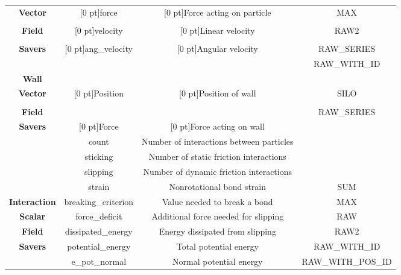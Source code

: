 \begin{table}[h]
\begin{center}
\begin{tabular}{|c|c|c|c|}
  \textbf{Vector} & \raisebox{-2 ex}[0 pt]{force} & \raisebox{-2 ex}[0 pt]{Force acting on particle} & \footnotesize{MAX} \\[2.25 ex]\cline{2-3}\\[-5 ex]
  \textbf{Field} & \raisebox{-2.75 ex}[0 pt]{velocity} & \raisebox{-2.75 ex}[0 pt]{Linear velocity} & \footnotesize{RAW2} \\[3 ex]\cline{2-3}\\[-5.75 ex]
  \textbf{Savers} & \raisebox{-3.5 ex}[0 pt]{ang\_velocity} & \raisebox{-3.5 ex}[0 pt]{Angular velocity} & \footnotesize{RAW\_SERIES} \\[-3 ex]
  &  &  & \footnotesize{RAW\_WITH\_ID} \\[0.5 ex]
  \hline\hline 
  \textbf{Wall} &  &  & \\
  \textbf{Vector} & \raisebox{1.25 ex}[0 pt]{Position} & \raisebox{1.25 ex}[0 pt]{Position of wall} & \footnotesize{SILO}\\[-0.25 ex] \cline{2-3}\\[-2.6 ex]
  \textbf{Field} &  &  & \footnotesize{RAW\_SERIES}\\[-0.5 ex]
  \textbf{Savers} & \raisebox{1 ex}[0 pt]{Force} & \raisebox{1 ex}[0 pt]{Force acting on wall} & \\
  \hline\hline 
  & count & Number of interactions between particles & \\\cline{2-3}
  & sticking & Number of static friction interactions & \\\cline{2-3}
  & slipping & Number of dynamic friction interactions & \\\cline{2-3}
  & strain & Nonrotational bond strain & \footnotesize{SUM}\\\cline{2-3}
  \textbf{Interaction} & breaking\_criterion & Value needed to break a bond & \footnotesize{MAX}\\\cline{2-3}
  \textbf{Scalar} & force\_deficit & Additional force needed for slipping & \footnotesize{RAW}\\\cline{2-3}
  \textbf{Field} & dissipated\_energy & Energy dissipated from slipping & \footnotesize{RAW2}\\\cline{2-3}
  \textbf{Savers} & potential\_energy & Total potential energy & \footnotesize{RAW\_WITH\_ID}\\\cline{2-3}
  & e\_pot\_normal & Normal potential energy & \footnotesize{RAW\_WITH\_POS\_ID}\\\cline{2-3}

\end{tabular}
\end{center}
\end{table}
